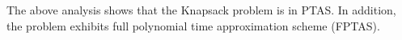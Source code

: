 % 
% 
% 

The above analysis shows that the Knapsack problem is in PTAS. In addition, the problem exhibits full polynomial time approximation scheme (FPTAS).


% 
% 

